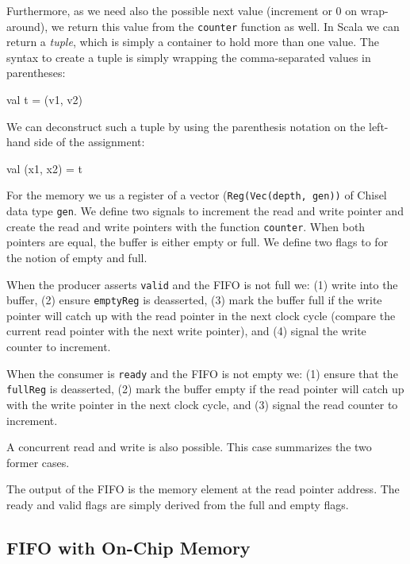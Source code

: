 \documentclass[%
    10pt,
    headinclude, footexclude,
    openright, %
    notitlepage,
    cleardoubleempty,
    headsepline,
    pointlessnumbers,
    bibtotoc, idxtotoc,
    ]{scrbook}
\newcommand{\code}[1]{{\lstinline[basicstyle=\small\ttfamily]{#1}}}
\newcommand{\todo}[1]{{\emph{TODO: #1}}}
\renewcommand{\todo}[1]{}
\begin{document}
Furthermore, as we need also the
possible next value (increment or 0 on wrap-around), we return this value from
the \code{counter} function as well. In Scala we can return a \emph{tuple},
which is simply a container to hold more than one value. The syntax to create
a tuple is simply wrapping the comma-separated values in parentheses:

\begin{chisel}
  val t = (v1, v2)
\end{chisel}

\noindent We can deconstruct such a tuple by using the parenthesis notation
on the left-hand side of the assignment:

\begin{chisel}
val (x1, x2) = t
\end{chisel}

For the memory we us a register of a vector (\code{Reg(Vec(depth, gen))} of
Chisel data type \code{gen}. We define two signals to increment the read and
write pointer and create the read and write pointers with the function \code{counter}.
When both pointers are equal, the buffer is either empty or full.
We define two flags to for the notion of empty and full.

When the producer asserts \code{valid} and the FIFO is not full we:
(1) write into the buffer, (2) ensure \code{emptyReg} is deasserted,
(3) mark the buffer full if the write pointer will catch up with the read pointer
in the next clock cycle (compare the current read pointer with the next
write pointer), and (4) signal the write counter to increment.

When the consumer is \code{ready} and the FIFO is not empty we:
(1) ensure that the \code{fullReg} is deasserted, (2) mark the buffer
empty if the read pointer will catch up with the write pointer in
the next clock cycle, and (3) signal the read counter to increment.

A concurrent read and write is also possible. This case summarizes
the two former cases. \todo{I am not sure if the edge cases are correct.
A read and write to on a full buffer should work, shouldn't it?}

The output of the FIFO is the memory element at the read pointer address.
The ready and valid flags are simply derived from the full and empty
flags.

\subsection{FIFO with On-Chip Memory}
\end{document}
